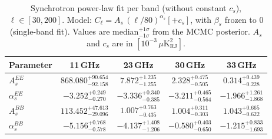 \begin{table}[htbp]
\centering
\caption{Synchrotron power-law fit per band (without constant $c_s$), $\ell \in [30, 200]$. Model: $C_\ell = A_s\,(\ell/80)^{\alpha_s} [+ c_s]$, with $\beta_s$ frozen to 0 (single-band fit). Values are median$^{+1\sigma}_{-1\sigma}$ from the MCMC posterior. $A_s$ and $c_s$ are in $[10^{-3}\,\mu\mathrm{K}^2_\mathrm{RJ}]$.}
\label{tab:sync_single_band_noc_ell30-200}
\begin{tabular}{lcccc}
\toprule
Parameter & 11\,GHz & 23\,GHz & 30\,GHz & 33\,GHz \\
\midrule
$A_s^{EE}$ & $868.080^{+90.654}_{-92.158}$ & $7.872^{+1.235}_{-1.255}$ & $2.328^{+0.475}_{-0.505}$ & $0.314^{+0.439}_{-0.228}$ \\
$\alpha_s^{EE}$ & $-3.252^{+0.249}_{-0.270}$ & $-3.336^{+0.340}_{-0.385}$ & $-3.211^{+0.465}_{-0.564}$ & $-1.966^{+1.261}_{-1.868}$ \\
\midrule
$A_s^{BB}$ & $113.452^{+47.613}_{-29.096}$ & $1.007^{+0.763}_{-0.435}$ & $1.004^{+0.311}_{-0.303}$ & $1.043^{+0.665}_{-0.622}$ \\
$\alpha_s^{BB}$ & $-5.156^{+0.768}_{-0.578}$ & $-4.137^{+1.408}_{-1.206}$ & $-0.580^{+0.403}_{-0.650}$ & $-1.215^{+0.833}_{-1.693}$ \\
\bottomrule
\end{tabular}
\end{table}